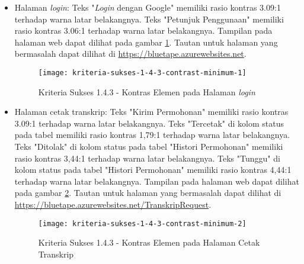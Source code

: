 \begin{itemize}
    \item Halaman \textit{login}: Teks "\textit{Login} dengan Google" memiliki rasio kontras 3.09:1 terhadap warna latar belakangnya. Teks "Petunjuk Penggunaan" memiliki rasio kontras 3.06:1 terhadap warna latar belakangnya. Tampilan pada halaman web dapat dilihat pada gambar \ref{fig:1.4.3_contrast_minimum_1}. Tautan untuk halaman yang bermasalah dapat dilihat di \url{https://bluetape.azurewebsites.net}.
    \begin{figure}[H]
        \centering  
        \texttt{[image: kriteria-sukses-1-4-3-contrast-minimum-1]}  
        \caption[Kriteria Sukses 1.4.3 - Kontras Elemen pada Halaman \textit{login}]{Kriteria Sukses 1.4.3 - Kontras Elemen pada Halaman \textit{login}}
        \label{fig:1.4.3_contrast_minimum_1}  
    \end{figure} 
    
    \item Halaman cetak transkrip: Teks "Kirim Permohonan" memiliki rasio kontras 3.09:1 terhadap warna latar belakangnya. Teks "Tercetak" di kolom status pada tabel memiliki rasio kontras 1,79:1 terhadap warna latar belakangnya. Teks "Ditolak" di kolom status pada tabel "Histori Permohonan" memiliki rasio kontras 3,44:1 terhadap warna latar belakangnya. Teks "Tunggu" di kolom status pada tabel "Histori Permohonan" memiliki rasio kontras 4,44:1 terhadap warna latar belakangnya. Tampilan pada halaman web dapat dilihat pada gambar \ref{fig:1.4.3_contrast_minimum_2}. Tautan untuk halaman yang bermasalah dapat dilihat di \url{https://bluetape.azurewebsites.net/TranskripRequest}.
    \begin{figure}[H]
        \centering  
        \texttt{[image: kriteria-sukses-1-4-3-contrast-minimum-2]}  
        \caption[Kriteria Sukses 1.4.3 - Kontras Elemen pada Halaman Cetak Transkrip]{Kriteria Sukses 1.4.3 - Kontras Elemen pada Halaman Cetak Transkrip}
        \label{fig:1.4.3_contrast_minimum_2}  
    \end{figure} 
    

\end{itemize}
